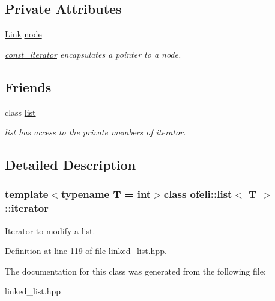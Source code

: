 \subsection*{Private Attributes}
\begin{DoxyCompactItemize}
\item 
\hypertarget{classofeli_1_1list_1_1iterator_a6be3588fe536436d8c35c7db94beeb08}{\hyperlink{classofeli_1_1list_a7765ecb875543506d04dbd466f754503}{Link} \hyperlink{classofeli_1_1list_1_1iterator_a6be3588fe536436d8c35c7db94beeb08}{node}}\label{classofeli_1_1list_1_1iterator_a6be3588fe536436d8c35c7db94beeb08}

\begin{DoxyCompactList}\small\item\em {\itshape \hyperlink{classofeli_1_1list_1_1const__iterator}{const\-\_\-iterator}} encapsulates a pointer to a node. \end{DoxyCompactList}\end{DoxyCompactItemize}
\subsection*{Friends}
\begin{DoxyCompactItemize}
\item 
\hypertarget{classofeli_1_1list_1_1iterator_a39e8296e3b93358d0af90000b5d9113c}{class \hyperlink{classofeli_1_1list_1_1iterator_a39e8296e3b93358d0af90000b5d9113c}{list}}\label{classofeli_1_1list_1_1iterator_a39e8296e3b93358d0af90000b5d9113c}

\begin{DoxyCompactList}\small\item\em {\itshape list} has access to the private members of iterator. \end{DoxyCompactList}\end{DoxyCompactItemize}


\subsection{Detailed Description}
\subsubsection*{template$<$typename T = int$>$class ofeli\-::list$<$ T $>$\-::iterator}

Iterator to modify a list. 

Definition at line 119 of file linked\-\_\-list.\-hpp.



The documentation for this class was generated from the following file\-:\begin{DoxyCompactItemize}
\item 
linked\-\_\-list.\-hpp\end{DoxyCompactItemize}
